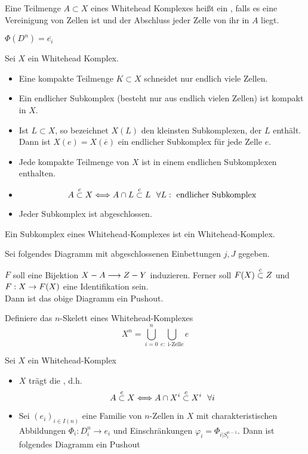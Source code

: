 \Def{}
Eine Teilmenge $A \subset X$ eines Whitehead Komplexes heißt ein , falls es eine Vereinigung von Zellen ist und der Abschluss jeder Zelle von ihr in $A$ liegt.

\Bem{}
$\Phi(D^n) = \overline{e_i}$

\Satz{}
Sei $X$ ein Whitehead Komplex.
\begin{itemize}
\item Eine kompakte Teilmenge $K \subset X$ schneidet nur endlich viele Zellen.
\item Ein endlicher Subkomplex (besteht nur aus endlich vielen Zellen) ist kompakt in $X$.
\item Ist $L\subset X$, so bezeichnet $X(L)$ den kleinsten Subkomplexen, der $L$ enthält. Dann ist $X(e) = X(\overline{e})$ ein endlicher Subkomplex für jede Zelle $e$.
\item Jede kompakte Teilmenge von $X$ ist in einem endlichen Subkomplexen enthalten.
\item
\[A \overset{c}{\subset} X \Longleftrightarrow A\cap L \overset{c}{\subset} L ~~\forall L : \text{ endlicher Subkomplex}  \]
\item Jeder Subkomplex ist abgeschlossen.
\end{itemize}

\Satz{}
Ein Subkomplex eines Whitehead-Komplexes ist ein Whitehead-Komplex.

Sei folgendes Diagramm mit abgeschlossenen Einbettungen $j,J$ gegeben.
\begin{center}
\end{center}
$F$ soll eine Bijektion $X -A \overset{}{\longrightarrow} Z -Y$ induzieren. Ferner soll $F(X) \overset{c}{\subset} Z$ und $F : X \overset{}{\rightarrow} F(X)$ eine Identifikation sein.\\
Dann ist das obige Diagramm ein Pushout.

\Def{}
Definiere das $n$-Skelett eines Whitehead-Komplexes
\[X^n = \bigcup_{i=0}^n \bigcup_{e : \text{ i-Zelle}}e \]

\Satz{}
Sei $X$ ein Whitehead-Komplex
\begin{itemize}
\item $X$ trägt die , d.h.
\[ A \overset{c}{\subset} X \Longleftrightarrow A\cap X^i \overset{c}{\subset} X^i ~~\forall i  \]
\item Sei $(e_i)_{i\in I(n)}$ eine Familie von $n$-Zellen in $X$ mit charakteristischen Abbildungen $\Phi_i : D_i^n \rightarrow e_i$ und Einschränkungen $\varphi_i = \Phi_{i|S^{n-1}_i}$. Dann ist folgendes Diagramm ein Pushout
\begin{center}
\end{center}
\end{itemize}

